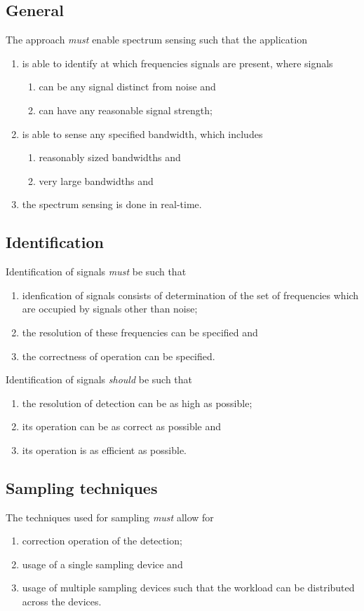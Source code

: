 \documentclass[a4paper, openany, oneside]{memoir}
\begin{document}
\subsection{General}
The approach \emph{must} enable spectrum sensing such that the application
\begin{enumerate}
    \item is able to identify at which frequencies signals are present, where signals
    \begin{enumerate}
        \item can be any signal distinct from noise and
        \item can have any reasonable signal strength;
    \end{enumerate}
    \item is able to sense any specified bandwidth, which includes
    \begin{enumerate}
        \item reasonably sized bandwidths and
        \item very large bandwidths and
    \end{enumerate}
    \item the spectrum sensing is done in real-time.
\end{enumerate}

\subsection{Identification}
Identification of signals \emph{must} be such that
\begin{enumerate}
    \item idenfication of signals consists of determination of the set of frequencies which are occupied by signals other than noise;
    \item the resolution of these frequencies can be specified and
    \item the correctness of operation can be specified.
\end{enumerate}
Identification of signals \emph{should} be such that
\begin{enumerate}
    \item the resolution of detection can be as high as possible;
    \item its operation can be as correct as possible and
    \item its operation is as efficient as possible.
\end{enumerate}

\subsection{Sampling techniques}
The techniques used for sampling \emph{must} allow for
\begin{enumerate}
    \item correction operation of the detection;
    \item usage of a single sampling device and
    \item usage of multiple sampling devices such that the workload can be distributed across the devices.
\end{enumerate}
\end{document}
